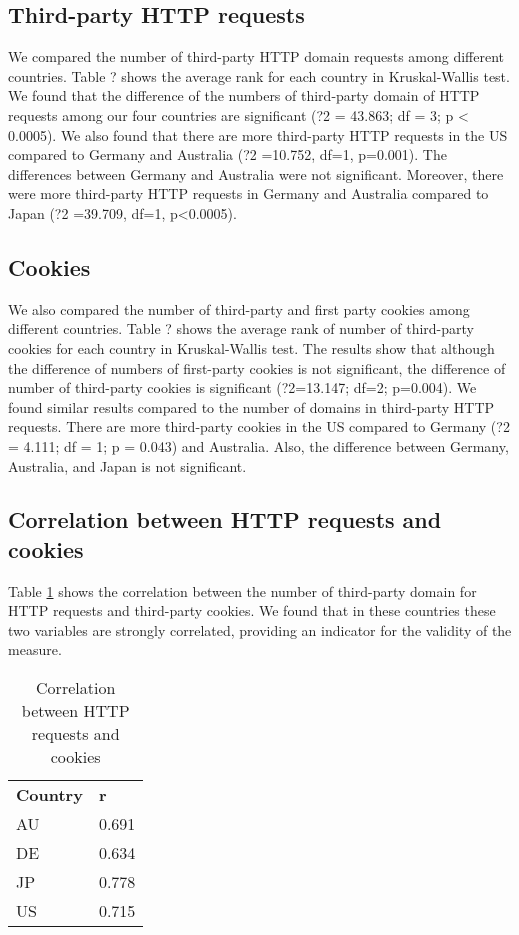 \documentclass[journal]{IEEEtran}
\begin{document}
\subsection{Third-party HTTP requests}
We compared the number of third-party HTTP domain requests among different countries. 
Table ? shows the average rank for each country in Kruskal-Wallis test. We found that the difference of the numbers of third-party domain of HTTP requests among our four countries are significant (?2 = 43.863; df = 3; p < 0.0005). We also found that there are more third-party HTTP requests in the US compared to Germany and Australia (?2 =10.752, df=1, p=0.001). The differences between Germany and Australia were not significant. Moreover, there were more third-party HTTP requests in Germany and Australia compared to Japan (?2 =39.709, df=1, p<0.0005).

\subsection{Cookies}
We also compared the number of third-party and first party cookies among different countries. 
Table ? shows the average rank of number of third-party cookies for each country in Kruskal-Wallis test. The results show that although the difference of numbers of first-party cookies is not significant, the difference of number of third-party cookies is significant (?2=13.147; df=2; p=0.004).
We found similar results compared to the number of domains in third-party HTTP requests. There are more third-party cookies in the US compared to Germany (?2 = 4.111; df = 1; p = 0.043) and Australia. Also, the difference between Germany, Australia, and Japan is not significant.

\subsection{Correlation between HTTP requests and cookies}
Table \ref{correlation} shows the correlation between the number of third-party domain for HTTP requests and third-party cookies. We found that in these countries these two variables are strongly correlated, providing an indicator for the validity of the measure.

\begin{table}[t]
\centering
\caption{Correlation between HTTP requests and cookies}
\label{correlation}
\begin{tabular}{ll}
\textbf{Country} & \textbf{r} \\
AU               & 0.691      \\
DE               & 0.634      \\
JP               & 0.778      \\
US               & 0.715     
\end{tabular}
\end{table}
\end{document}
